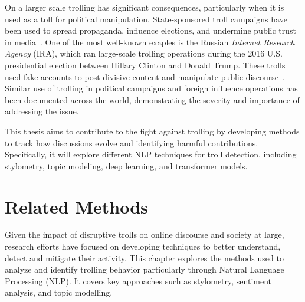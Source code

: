 \documentclass[twoside]{ctuthesis}
\theoremstyle{plain}
\theoremstyle{definition}
\theoremstyle{note}
\begin{document}
On a larger scale trolling has significant consequences, particularly when it is used as a toll for political manipulation. State-sponsored troll campaigns have been used to spread propaganda, influence elections, and undermine public trust in media~\cite{Bradshaw2017TroopsTrolls}. One of the most well-known exaples is the Russian \textit{Internet Research Agency} (IRA), which ran large-scale trolling operations during the 2016 U.S. presidential election between Hillary Clinton and Donald Trump. These trolls used fake accounts to post divisive content and manipulate public discourse~\cite{Linvill2020IRATrolls}. Similar use of trolling in political campaigns and foreign influence operations has been documented across the world, demonstrating the severity and importance of addressing the issue.\par

This thesis aims to contribute to the fight against trolling by developing methods to track how discussions evolve and identifying harmful contributions. Specifically, it will explore different NLP techniques for troll detection, including stylometry, topic modeling, deep learning, and transformer models.

\chapter{Related Methods}
Given the impact of disruptive trolls on online discourse and society at large, research efforts have focused on developing techniques to better understand, detect and mitigate their activity. This chapter explores the methods used to analyze and identify trolling behavior particularly through Natural Language Processing (NLP). It covers key approaches such as stylometry, sentiment analysis, and topic modelling.
\end{document}

